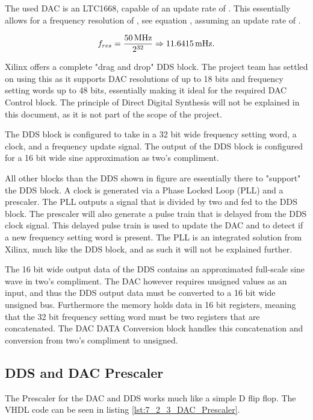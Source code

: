 The used DAC is an LTC1668, capable of an update rate of . This essentially allows for a frequency resolution of , see equation , assuming an update rate of .

\begin{equation}
    \label{eq:7_2_3_resolution}
    f_{res} = \frac{\SI{50}{\mega\hertz}}{2^{32}} \Rightarrow \SI{11.6415}{\milli\hertz}. 
\end{equation}

Xilinx offers a complete "drag and drop" DDS block. The project team has settled on using this as it supports DAC resolutions of up to 18 bits and frequency setting words up to 48 bits, essentially making it ideal for the required DAC Control block. The principle of Direct Digital Synthesis will not be explained in this document, as it is not part of the scope of the project.

The DDS block is configured to take in a 32 bit wide frequency setting word, a  clock, and a frequency update signal. The output of the DDS block is configured for a 16 bit wide sine approximation as two's compliment.

All other blocks than the DDS shown in figure  are essentially there to "support" the DDS block. A  clock is generated via a Phase Locked Loop (PLL) and a prescaler. The PLL outputs a  signal that is divided by two and fed to the DDS block. The prescaler will also generate a  pulse train that is delayed from the DDS clock signal. This delayed pulse train is used to update the DAC and to detect if a new frequency setting word is present. The PLL is an integrated solution from Xilinx, much like the DDS block, and as such it will not be explained further.

The 16 bit wide output data of the DDS contains an approximated full-scale sine wave in two's compliment. The DAC however requires unsigned values as an input, and thus the DDS output data must be converted to a 16 bit wide unsigned bus. Furthermore the memory holds data in 16 bit registers, meaning that the 32 bit frequency setting word must be two registers that are concatenated. The DAC DATA Conversion block handles this concatenation and conversion from two's compliment to unsigned.

\subsection{DDS and DAC Prescaler}
The Prescaler for the DAC and DDS works much like a simple D flip flop. The VHDL code can be seen in listing \ref{lst:7_2_3_DAC_Prescaler}. 

